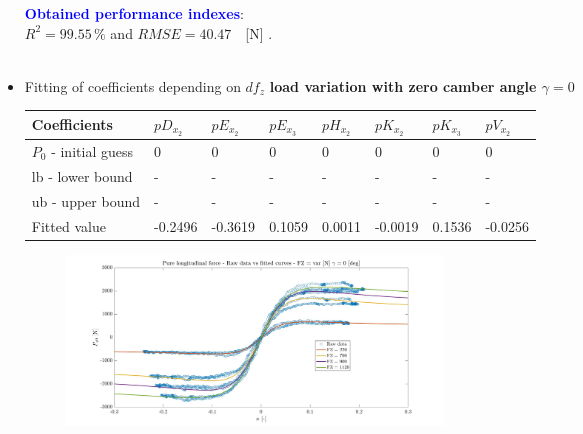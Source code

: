 \documentclass{IEEEtran}
\begin{document}
\begin{itemize}
              
                
                \textbf{\textcolor{blue}{Obtained performance indexes}}: \\ $R^{2} = 99.55 \, \%$ and $RMSE = 40.47 \, $ \, [N] .\\\\
                

            \item Fitting of coefficients depending on \underline{$df_z$} \textbf{load variation with zero camber angle $\gamma = 0$}
                \begin{table}[!h]
                \begin{adjustbox}{width=\columnwidth,center}
                    
                    \begin{tabular}{|l|l|l|l|l|l|l|l|}
                    \hline
                    Coefficients       & $pD_{x_2}$    & $pE_{x_2}$    & $pE_{x_3}$   & $pH_{x_2}$  & $pK_{x_2}$    & $pK_{x_3}$   & $pV_{x_2}$    \\ 
                    \hline
                    $P_0$ - initial guess & 0       & 0       & 0      & 0      & 0       & 0      & 0       \\ \hline
                    lb - lower bound   & -       & -       & -      & -      & -       & -      & -       \\ \hline
                    ub - upper bound   & -       & -       & -      & -      & -       & -      & -       \\ \hline
                    Fitted value       & -0.2496 & -0.3619 & 0.1059 & 0.0011 & -0.0019 & 0.1536 & -0.0256 \\ \hline
                    \end{tabular}
                    \end{adjustbox}
                \end{table}
                
                
                \begin{figure}[!h]
                    \centerline{\includegraphics[width = 3.95in]{pure_longitudinal_2.jpg}}
                   

\end{figure}
\end{itemize}
\end{document}
